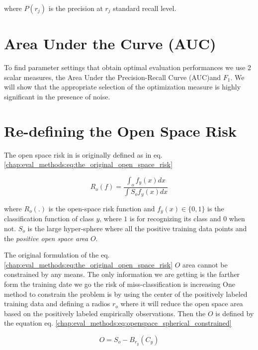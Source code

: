 \noindent
where $P(r_j)$ is the precision at $r_j$ standard recall level.


\section{Area Under the Curve (AUC)}\label{chap:eval_methods:sec:closed_set_classification} 

To find parameter settings that obtain optimal evaluation performances we use 2 scalar measures, the Area Under the Precision-Recall Curve (AUC)and $F_{1}$. We will show that the appropriate selection of the optimization measure is highly significant in the presence of noise.


\section{Re-defining the Open Space Risk}\label{chap:eval_methods:sec:open_space_risk} 

The open space risk in \parencite{scheirer2013toward} is originally defined as in eq. \ref{chap:eval_methods:eq:the_original_open_space_risk}

\begin{equation}\label{chap:eval_methods:eq:the_original_open_space_risk}
	R_{o}(f) = \frac{\int_{o} f_{y}(x) dx}{\int{S_{o}}  f_{y}(x) dx}
\end{equation}

\noindent
where $R_{o}(.)$ is the open-space risk function and $f_{y}(x)  \in \{0, 1\}$ is the classification function of class $y$, where $1$ is for recognizing its class and $0$ when not. $S_{o}$ is the large hyper-sphere where all the positive training data points and the \textit{positive open space area} $O$. 

The original formulation of the eq. \ref{chap:eval_methods:eq:the_original_open_space_risk} $O$ area cannot be constrained by any means. The only information we are getting is the farther form the training date we go the risk of miss-classification is increasing One method to constrain the problem is by using the center of the positively labeled training data and defining a radios $r_{o}$ where it will reduce the open space area based on the positively labeled empirically observations. Then the $O$ is defined by the equation eq. \ref{chap:eval_methods:eq:openspace_spherical_constrained}

\begin{equation}\label{chap:eval_methods:eq:openspace_spherical_constrained}
	O = S_{o} - B_{r_{y}}(C_{y})
\end{equation}

